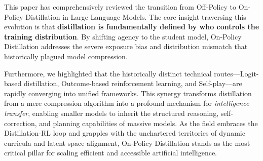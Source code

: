 \documentclass{article}
\begin{document}
This paper has comprehensively reviewed the transition from Off-Policy to On-Policy Distillation in Large Language Models. The core insight traversing this evolution is that \textbf{distillation is fundamentally defined by who controls the training distribution}. By shifting agency to the student model, On-Policy Distillation addresses the severe exposure bias and distribution mismatch that historically plagued model compression.

Furthermore, we highlighted that the historically distinct technical routes—Logit-based distillation, Outcome-based reinforcement learning, and Self-play—are rapidly converging into unified frameworks. This synergy transforms distillation from a mere compression algorithm into a profound mechanism for \textit{intelligence transfer}, enabling smaller models to inherit the structured reasoning, self-correction, and planning capabilities of massive models. As the field embraces the Distillation-RL loop and grapples with the unchartered territories of dynamic curricula and latent space alignment, On-Policy Distillation stands as the most critical pillar for scaling efficient and accessible artificial intelligence.



\end{document}
